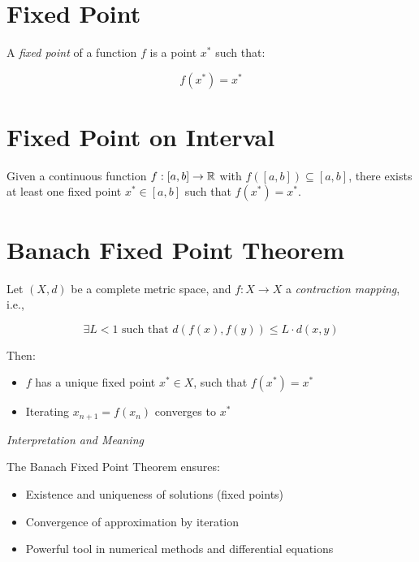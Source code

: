 \section{Fixed Point}

A \emph{fixed point} of a function \(f\) is a point \(x^*\) such that:

\[
    f(x^*) = x^*
\]

\section{Fixed Point on Interval}

Given a continuous function \(f:[a,b] \to \mathbb{R}\) with \(f([a,b]) \subseteq [a,b]\), there exists at least one fixed 
point \(x^* \in [a,b]\) such that \(f(x^*) = x^*\).

\section{Banach Fixed Point Theorem}

Let \((X, d)\) be a complete metric space, and \(f: X \to X\) a \emph{contraction mapping}, i.e.,

\[
    \exists L < 1 \text{ such that } d(f(x), f(y)) \le L \cdot d(x, y)
\]

Then:

\begin{itemize}

    \item \(f\) has a unique fixed point \(x^* \in X\), such that \(f(x^*) = x^*\)

    \item Iterating \(x_{n+1} = f(x_n)\) converges to \(x^*\)

\end{itemize}

\emph{Interpretation and Meaning}

The Banach Fixed Point Theorem ensures:

\begin{itemize}

    \item Existence and uniqueness of solutions (fixed points)

    \item Convergence of approximation by iteration

    \item Powerful tool in numerical methods and differential equations

\end{itemize}

